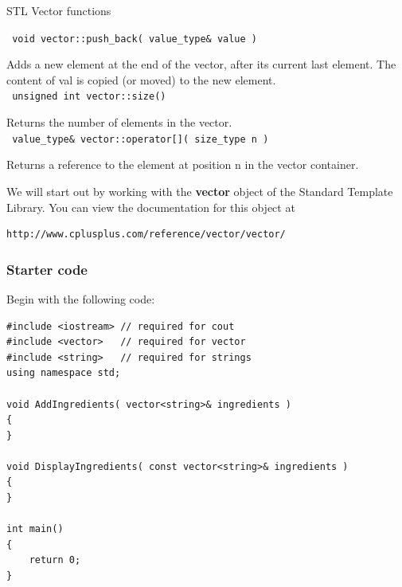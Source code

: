 \documentclass[a4paper,12pt]{book}
\begin{document}
                \begin{intro}{STL Vector functions}

                    \footnotesize
                    
                    \texttt{ void vector::push\_back( value\_type\&  value ) }

                        Adds a new element at the end of the vector, after its current last element.
                        The content of val is copied (or moved) to the new element. \\
                    
                    \texttt{ unsigned int vector::size() }

                        Returns the number of elements in the vector. \\
                    
                    \texttt{ value\_type\& vector::operator[]( size\_type n ) }

                        Returns a reference to the element at position n in the vector container. \\
                    
                    

                    
                \end{intro}
            
                We will start out by working with the \textbf{ vector } object
                of the Standard Template Library.  You can view the documentation
                for this object at
\begin{verbatim}
http://www.cplusplus.com/reference/vector/vector/ 
\end{verbatim}
                \hrulefill{}
                \subsubsection*{ Starter code }
                    Begin with the following code:

\begin{lstlisting}[style=code]
#include <iostream> // required for cout
#include <vector>   // required for vector
#include <string>   // required for strings
using namespace std;

void AddIngredients( vector<string>& ingredients )
{
}

void DisplayIngredients( const vector<string>& ingredients )
{
}

int main()
{ 
    return 0;
}
\end{lstlisting}
\end{document}
